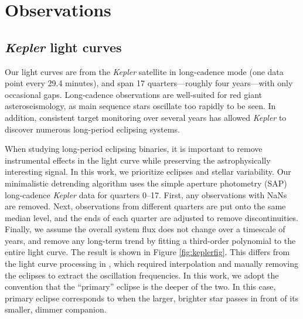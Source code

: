 \section{Observations}\label{data}

\subsection{\emph{Kepler} light curves}\label{kepler}
Our light curves are from the \emph{Kepler} satellite in long-cadence mode (one data point every 29.4 minutes), and span 17 quarters---roughly four years---with only occasional gaps. Long-cadence observations are well-suited for red giant asteroseismology, as main sequence stars oscillate too rapidly to be seen. In addition, consistent target monitoring over several years has allowed \emph{Kepler} to discover numerous long-period eclipsing systems.

When studying long-period eclipsing binaries, it is important to remove instrumental effects in the light curve while preserving the astrophysically interesting signal. In this work, we prioritize eclipses and stellar variability. Our minimalistic detrending algorithm uses the simple aperture photometry (SAP) long-cadence \emph{Kepler} data for quarters 0--17. First, any observations with NaNs are removed. Next, observations from different quarters are put onto the same median level, and the ends of each quarter are adjusted to remove discontinuities. Finally, we assume the overall system flux does not change over a timescale of years, and remove any long-term trend by fitting a third-order polynomial to the entire light curve. The result is shown in Figure \ref{fig:keplerfig}. This differs from the light curve processing in \citet{gau14}, which required interpolation and maually removing the eclipses to extract the oscillation frequencies. In this work, we adopt the convention that the ``primary'' eclipse is the deeper of the two. In this case, primary eclipse corresponds to when the larger, brighter star passes in front of its smaller, dimmer companion.
